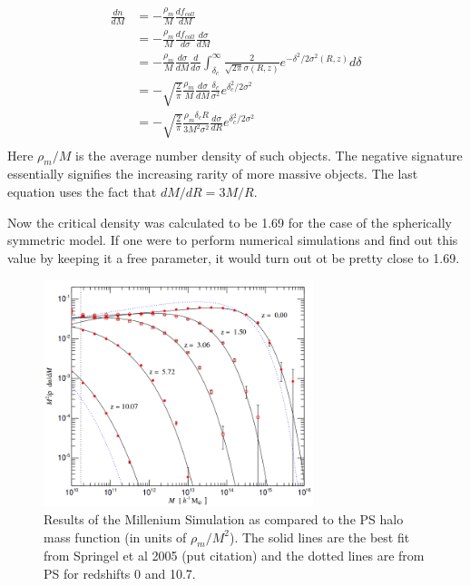 \documentclass[12pt,a4paper,twoside]{book}
\begin{document}
			\begin{equation}
				\begin{aligned}
					\frac{dn}{dM}&=-\frac{\rho_m}{M}\frac{df_{coll}}{dM}\\
					&=-\frac{\rho_m}{M}\frac{df_{coll}}{d\sigma}\frac{d\sigma}{dM}\\
					&=-\frac{\rho_m}{M}\frac{d\sigma}{dM}\frac{d}{d\sigma}\int_{\delta_c}^{\infty}\frac{2}{\sqrt{2\pi}\sigma(R,z)}e^{-\delta^2/2\sigma^2(R,z)}d\delta\\
					&=-\sqrt{\frac{2}{\pi}}\frac{\rho_m}{M}\frac{d\sigma}{dM}\frac{\delta_c}{\sigma^2}e^{\delta_c^2/2\sigma^2}\\
					&=-\sqrt{\frac{2}{\pi}}\frac{\rho_m\delta_cR}{3M^2\sigma^2}\frac{d\sigma}{dR}e^{\delta_c^2/2\sigma^2}\\
				\end{aligned}
			\end{equation}
			Here $\rho_m/M$ is the average number density of such objects. The negative signature essentially signifies the increasing rarity of more massive objects. The last equation uses the fact that $dM/dR = 3M/R$.
			
			Now the critical density was calculated to be 1.69 for the case of the spherically symmetric model. If one were to perform numerical simulations and find out this value by keeping it a free parameter, it would turn out ot be pretty close to 1.69.
			\begin{figure}[h!]
				\centering
				\includegraphics[width=0.7\textwidth]{springel.png}
				\caption{Results of the Millenium Simulation as compared to the PS halo mass function (in units of $\rho_m/M^2$). The solid lines are the best fit from Springel et al 2005 (put citation) and the dotted lines are from PS for redshifts 0 and 10.7.}
				\label{fig:springel}
			\end{figure}
\end{document}
